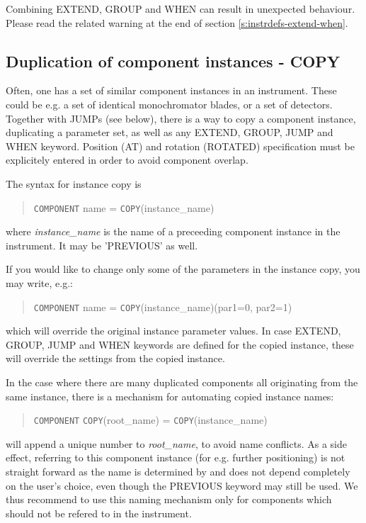 Combining EXTEND, GROUP and WHEN can result in unexpected behaviour. Please read the related warning at the end of section \ref{s:instrdefs-extend-when}.

\subsection{Duplication of component instances - COPY}
\label{s:instrdefs-extend-copy}

Often, one has a set of similar component instances in an instrument. These could be e.g. a set of identical monochromator blades, or a set of detectors.
Together with JUMPs (see below), there is a way to copy a component instance, duplicating a parameter set, as well as any EXTEND, GROUP, JUMP and WHEN keyword.
Position (AT) and rotation (ROTATED) specification must be explicitely entered in order to avoid component overlap.

The syntax for instance copy is
\begin{quote}
  \texttt{COMPONENT} name = \texttt{COPY}(instance\_name)
\end{quote}
where \textit{instance\_name} is the name of a preceeding component instance in the instrument. It may be 'PREVIOUS' as well.

If you would like to change only some of the parameters in the instance copy, you may write, e.g.:
\begin{quote}
  \texttt{COMPONENT} name = \texttt{COPY}(instance\_name)(par1=0, par2=1)
\end{quote}
which will override the original instance parameter values. In case EXTEND, GROUP, JUMP and WHEN
keywords are defined for the copied instance, these will override the settings
from the copied instance.

In the case where there are many duplicated components all originating from the same instance, there is a mechanism for automating copied instance names:
\begin{quote}
  \texttt{COMPONENT} \texttt{COPY}(root\_name) = \texttt{COPY}(instance\_name)
\end{quote}
will append a unique number to \textit{root\_name}, to avoid name
conflicts. As a side effect, referring to this component instance (for
e.g. further positioning) is not straight forward as the name is
determined by \MCX and does not depend completely on the user's
choice, even though the PREVIOUS keyword may still be used. We thus recommend to use this naming mechanism only for components which should not be refered to in the instrument.

